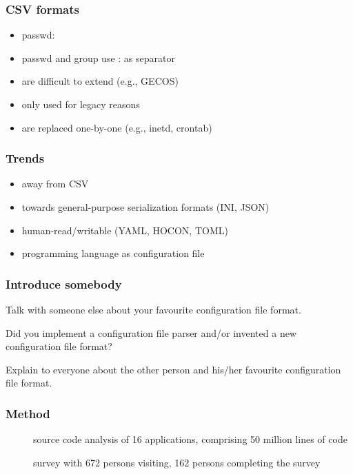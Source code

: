\documentclass{beamer}
\begin{document}
\begin{frame}
	\frametitle{CSV formats}
	\begin{itemize}
	\item passwd: 
	\item passwd and group use : as separator
	\item are difficult to extend (e.g., GECOS)
	\item only used for legacy reasons
	\item are replaced one-by-one (e.g., inetd, crontab)
	\end{itemize}
\end{frame}

\begin{frame}
	\frametitle{Trends}
	\begin{itemize}
	\item away from CSV
	\item towards general-purpose serialization formats (INI, JSON)
	\item human-read/writable (YAML, HOCON, TOML)
	\item programming language as configuration file
	\end{itemize}
\end{frame}

\begin{assignment}
	\frametitle{Introduce somebody}
	\begin{task}
	Talk with someone else about your favourite configuration file format.
	\end{task}

	\begin{task}
	Did you implement a configuration file parser and/or invented a new configuration file format?
	\end{task}

	\begin{task}
	Explain to everyone about the other person and his/her favourite configuration file format.
	\end{task}
\end{assignment}

\begin{frame}
	\frametitle{Method}
	\begin{description}
	\item[\methodSource{}] source code analysis of 16 applications, comprising 50 million lines of code~\cite{raab2017challenges}
	\item[\methodQuestion{}] survey with 672 persons visiting, 162 persons completing the survey~\cite{raab2017challenges}
	\end{description}
\end{frame}
\end{document}

